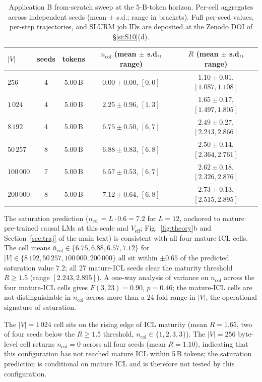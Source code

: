 \documentclass[11pt,a4paper]{article}
\begin{document}
\begin{table}[h]
\centering
\small
\caption{Application B from-scratch sweep at the 5-B-token horizon.
Per-cell aggregates across independent seeds (mean $\pm$ s.d.;
range in brackets). Full per-seed values, per-step trajectories,
and SLURM job IDs are deposited at the Zenodo DOI of
\S\ref{si:S10}(d).}
\label{tab:S11}
\begin{tabular}{lcccc}
\toprule
$|V|$ & seeds & tokens & $n_\mathrm{col}$ (mean $\pm$ s.d., range) & $R$ (mean $\pm$ s.d., range) \\
\midrule
$256$       & 4 & 5.00\,B & $0.00 \pm 0.00$, $[0,0]$    & $1.10 \pm 0.01$, $[1.087, 1.108]$ \\
$1\,024$    & 4 & 5.00\,B & $2.25 \pm 0.96$, $[1,3]$    & $1.65 \pm 0.17$, $[1.497, 1.805]$ \\
$8\,192$    & 4 & 5.00\,B & $6.75 \pm 0.50$, $[6,7]$    & $2.49 \pm 0.27$, $[2.243, 2.866]$ \\
$50\,257$   & 8 & 5.00\,B & $6.88 \pm 0.83$, $[6,8]$    & $2.50 \pm 0.14$, $[2.364, 2.761]$ \\
$100\,000$  & 7 & 5.00\,B & $6.57 \pm 0.53$, $[6,7]$    & $2.62 \pm 0.18$, $[2.326, 2.876]$ \\
$200\,000$  & 8 & 5.00\,B & $7.12 \pm 0.64$, $[6,8]$    & $2.73 \pm 0.13$, $[2.515, 2.895]$ \\
\bottomrule
\end{tabular}
\end{table}

The saturation prediction ($n_\mathrm{col}\!=\!L\!\cdot\!0.6\!=\!7.2$
for $L\!=\!12$, anchored to mature pre-trained causal LMs at this
scale and $V_\mathrm{eff}$; Fig.~\ref{fig:theory}b and
Section~\ref{sec:traj} of the main text) is consistent with all
four mature-ICL cells. The cell means
$\bar n_\mathrm{col}\!\in\!\{6.75, 6.88, 6.57, 7.12\}$ for
$|V|\!\in\!\{8\,192, 50\,257, 100\,000, 200\,000\}$ all sit within
$\pm 0.65$ of the predicted saturation value $7.2$; all 27 mature-ICL
seeds clear the maturity threshold $R\!\geq\!1.5$ (range
$[2.243, 2.895]$). A one-way analysis of variance on
$n_\mathrm{col}$ across the four mature-ICL cells gives
$F(3, 23)\!=\!0.90$, $p\!=\!0.46$; the mature-ICL cells are not
distinguishable in $n_\mathrm{col}$ across more than a 24-fold
range in $|V|$, the operational signature of saturation.

The $|V|\!=\!1\,024$ cell sits on the rising edge of ICL maturity
(mean $R\!=\!1.65$, two of four seeds below the
$R\!\geq\!1.5$ threshold, $n_\mathrm{col}\!\in\!\{1, 2, 3, 3\}$).
The $|V|\!=\!256$ byte-level cell returns $n_\mathrm{col}\!=\!0$
across all four seeds (mean $R\!=\!1.10$), indicating that this
configuration has not reached mature ICL within 5\,B tokens;
the saturation prediction is conditional on mature ICL and is
therefore not tested by this configuration.
\end{document}
